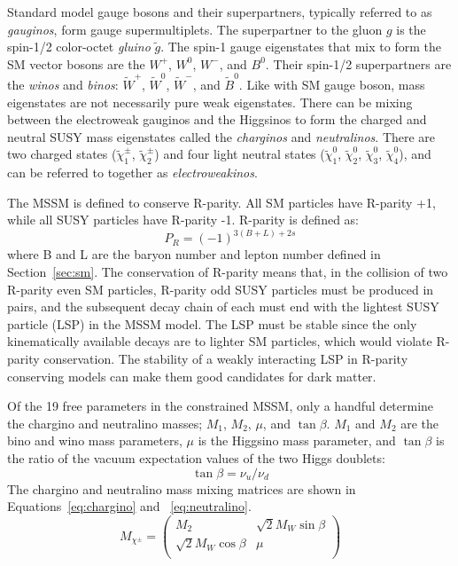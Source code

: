 Standard model gauge bosons and their superpartners, typically referred to as \textit{gauginos}, form gauge supermultiplets.  The superpartner to the gluon $g$ is the spin-1/2 color-octet \textit{gluino} $\tilde{g}$.  The spin-1 gauge eigenstates that mix to form the SM vector bosons are the $W^+$, $W^0$, $W^-$, and $B^0$.  Their spin-1/2 superpartners are the \textit{winos} and \textit{binos}: $\tilde{W}^+$, $\tilde{W}^0$, $\tilde{W}^-$, and $\tilde{B}^0$.  Like with SM gauge boson, mass eigenstates are not necessarily pure weak eigenstates.  There can be mixing between the electroweak gauginos and the Higgsinos to form the charged and neutral SUSY mass eigenstates called the \textit{charginos} and \textit{neutralinos}.  There are two charged states ($\tilde\chi_1^\pm$, $\tilde\chi_2^\pm$) and four light neutral states ($\tilde\chi_1^0$, $\tilde\chi_2^0$, $\tilde\chi_3^0$, $\tilde\chi_4^0$), and can be referred to together as \textit{electroweakinos}.
  
The MSSM is defined to conserve R-parity.  All SM particles have R-parity +1, while all SUSY particles have R-parity -1.  R-parity is defined as:
\begin{equation}
 P_R=(-1)^{3(B+L)+2s}
 \end{equation}
 where B and L are the baryon number and lepton number defined in Section~\ref{sec:sm}.  The conservation of R-parity means that, in the collision of two R-parity even SM particles, R-parity odd SUSY particles must be produced in pairs, and the subsequent decay chain of each must end with the lightest SUSY particle (LSP) in the MSSM model.  The LSP must be stable since the only kinematically available decays are to lighter SM particles, which would violate R-parity conservation.  The stability of a weakly interacting LSP in R-parity conserving models can make them good candidates for dark matter.  

Of the 19 free parameters in the constrained MSSM, only a handful determine the chargino and neutralino masses; $M_1$, $M_2$, $\mu$, and $\tan\beta$.  $M_1$ and $M_2$ are the bino and wino mass parameters, $\mu$ is the Higgsino mass parameter, and $\tan\beta$ is the ratio of the vacuum expectation values of the two Higgs doublets:
\begin{equation}
\tan\beta=\nu_u/\nu_d
\end{equation}
The chargino and neutralino mass mixing matrices are shown in Equations~\ref{eq:chargino} and ~\ref{eq:neutralino}.
\begin{equation}
M_{\chi^\pm}=
\begin{pmatrix}
M_2 & \sqrt{2}M_W\sin\beta \\
\sqrt{2}M_W\cos\beta & \mu \\
\end{pmatrix}
\label{eq:chargino}
\end{equation}

